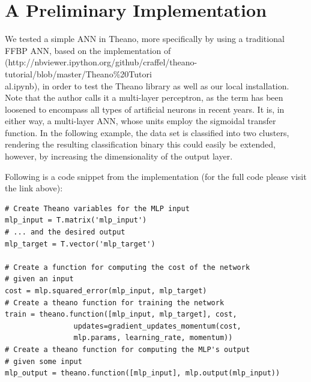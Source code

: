 \section{A Preliminary Implementation}

We tested a simple ANN in Theano, more specifically by using a traditional FFBP ANN, based on the implementation of
\\(http://nbviewer.ipython.org/github/craffel/theano-tutorial/blob/master/Theano\%20Tutori
\\al.ipynb), in order to test the Theano library as well as our local installation. Note that the author calls it a multi-layer perceptron, as the term has been loosened to encompass all types of artificial neurons in recent years. It is, in either way, a multi-layer ANN, whose units employ the sigmoidal transfer function. In the following example, the data set is classified into two clusters, rendering the resulting classification binary this could easily be extended, however, by increasing the dimensionality of the output layer.


Following is a code snippet from the implementation (for the full code please visit the link above):

\begin{verbatim}
# Create Theano variables for the MLP input
mlp_input = T.matrix('mlp_input')
# ... and the desired output
mlp_target = T.vector('mlp_target')

# Create a function for computing the cost of the network 
# given an input
cost = mlp.squared_error(mlp_input, mlp_target)
# Create a theano function for training the network
train = theano.function([mlp_input, mlp_target], cost,
                updates=gradient_updates_momentum(cost,
                mlp.params, learning_rate, momentum))
# Create a theano function for computing the MLP's output 
# given some input
mlp_output = theano.function([mlp_input], mlp.output(mlp_input))
\end{verbatim}

